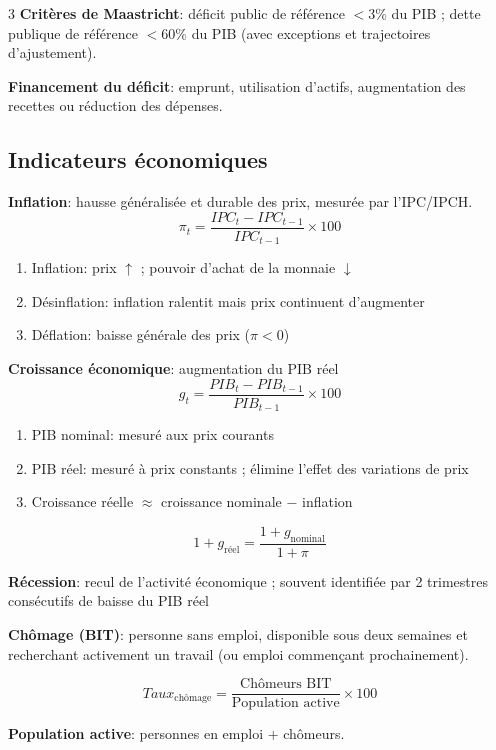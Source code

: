 \documentclass[12pt, a4paper]{article}
\begin{document}
\begin{multicols*}{3}
\textbf{Critères de Maastricht}: déficit public de référence $<3\%$ du PIB ; dette publique de référence $<60\%$ du PIB (avec exceptions et trajectoires d'ajustement).

\textbf{Financement du déficit}: emprunt, utilisation d'actifs, augmentation des recettes ou réduction des dépenses.

\subsection{Indicateurs économiques}

\textbf{Inflation}: hausse généralisée et durable des prix, mesurée par l'IPC/IPCH.
\[
\boxed{\pi_t=\frac{IPC_t-IPC_{t-1}}{IPC_{t-1}}\times100}
\]
\begin{enumerate}[\roman*.]
  \item Inflation: prix $\uparrow$ ; pouvoir d'achat de la monnaie $\downarrow$
  \item Désinflation: inflation ralentit mais prix continuent d'augmenter
  \item Déflation: baisse générale des prix ($\pi<0$)
\end{enumerate}

\textbf{Croissance économique}: augmentation du PIB réel
\[
\boxed{g_t=\frac{PIB_t-PIB_{t-1}}{PIB_{t-1}}\times100}
\]
\begin{enumerate}[\roman*.]
  \item PIB nominal: mesuré aux prix courants 
  \item PIB réel: mesuré à prix constants ; élimine l'effet des variations de prix
  \item Croissance réelle $\approx$ croissance nominale $-$ inflation
\end{enumerate}
\[
\boxed{1+g_{\text{réel}}=\frac{1+g_{\text{nominal}}}{1+\pi}}
\]

\textbf{Récession}: recul de l'activité économique ; souvent identifiée par 2 trimestres consécutifs de baisse du PIB réel

\colbreak

\textbf{Chômage (BIT)}: personne sans emploi, disponible sous deux semaines et recherchant activement un travail (ou emploi commençant prochainement).

\[
\boxed{Taux_{\text{chômage}}=
\frac{\text{Chômeurs BIT}}{\text{Population active}}\times100}
\]

\textbf{Population active}: personnes en emploi + chômeurs.


\end{multicols*}
\end{document}
